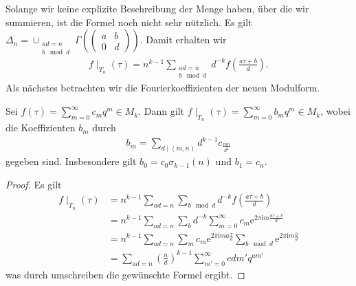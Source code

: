 Solange wir keine explizite Beschreibung der Menge haben, über die wir summieren, ist die Formel noch nicht sehr nützlich.
Es gilt $\Delta_n=\cup_{\substack{ad=n \\ b \mod d}} \Gamma(\begin{pmatrix}
a&b\\
0&d
\end{pmatrix})$.
Damit erhalten wir
\begin{align*}
f\mid_{T_n}(\tau)=n^{k-1} \sum_{\substack{ad=n\\ b \mod d}} d^{-k} f\left( \frac{a\tau+b}{d}\right).
\end{align*}
Als nächstes betrachten wir die Fourierkoeffizienten der neuen Modulform.

\begin{prop}
Sei $f(\tau)=\sum_{m=0}^\infty c_mq^m \in M_k$.
Dann gilt $f\mid_{T_n}(\tau)=\sum_{m=0}^\infty b_mq^m \in M_k$,
wobei die Koeffizienten $b_m$ durch
\begin{align*}
b_m=\sum_{d \mid (m,n)} d^{k-1} c_{\frac{mn}{d^2}}
\end{align*}
gegeben sind.
Insbesondere gilt $b_0=c_0\sigma_{k-1}(n)$ und $b_1=c_n$.
\end{prop}
\begin{proof}
Es gilt
\begin{align*}
f\mid_{T_n}(\tau)&=n^{k-1} \sum_{ad=n} \sum_{b\mod d} d^{-k} f\left(\frac{a \tau+b}{d}\right)\\
&=n^{k-1} \sum_{ad=n}\sum_b d^{-k} \sum_{m=0}^\infty c_m \mathrm{e}^{2 \pi \mathrm{i} m \frac{a\tau +b}{d}}\\
&=n^{k-1} \sum_{ad=n} \sum_m c_m \mathrm{e}^{2\pi \mathrm{i} m a \frac{\tau}{d}} \sum_{b \mod d} \mathrm{e}^{2\pi \mathrm{i} m  \frac{b}{d}}\\
&=\sum_{ad=n} \left(\frac{n}{d}\right)^{k-1} \sum_{m'=0}^\infty c{dm'} q^{am'}
\end{align*}
was durch umschreiben die gewünschte Formel ergibt.
\end{proof}


